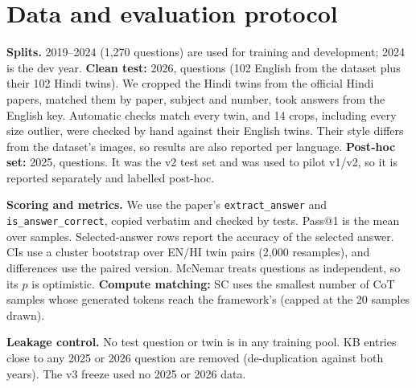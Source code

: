 \documentclass[conference]{IEEEtran}
\begin{document}
\section{Data and evaluation protocol}
\textbf{Splits.} 2019--2024 (1{,}270 questions) are used for training and development; 2024 is the
dev year.
\textbf{Clean test:} 2026, \NTest{} questions (102 English from the dataset plus their 102 Hindi
twins). We cropped the Hindi twins from the official Hindi papers, matched them by paper, subject
and number, took answers from the English key. Automatic checks match every twin, and 14 crops,
including every size outlier, were checked by hand against their English twins. Their style
differs from the dataset's images, so results are also reported per language.
\textbf{Post-hoc set:} 2025, \NPost{} questions. It was the v2 test set and was used to pilot
v1/v2, so it is reported separately and labelled post-hoc.

\textbf{Scoring and metrics.} We use the paper's \texttt{extract\_answer} and
\texttt{is\_answer\_correct}, copied verbatim and checked by tests. Pass@1 is the mean over samples.
Selected-answer rows report the accuracy of the selected answer. CIs use a cluster bootstrap over
EN/HI twin pairs (2{,}000 resamples), and differences use the paired version. McNemar treats
questions as independent, so its $p$ is optimistic.
\textbf{Compute matching:} SC uses the smallest number of CoT samples whose generated tokens reach
the framework's (capped at the 20 samples drawn).

\textbf{Leakage control.} No test question or twin is in any training pool. KB entries close to any
2025 or 2026 question are removed (de-duplication against both years). The v3 freeze used no
2025 or 2026 data.

\end{document}
